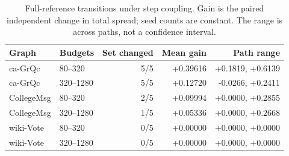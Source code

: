 \begin{table}[htbp]
\caption{Full-reference transitions under step coupling. Gain is the paired independent change in total spread; seed counts are constant. The range is across paths, not a confidence interval.}\label{tab:transitions}
\begin{tabular}{llrrr}
\toprule
Graph & Budgets & Set changed & Mean gain & Path range \\
\midrule
ca-GrQc & 80--320 & 5/5 & +0.39616 & +0.1819, +0.6139 \\
ca-GrQc & 320--1280 & 5/5 & +0.12720 & -0.0266, +0.2411 \\
CollegeMsg & 80--320 & 2/5 & +0.09994 & +0.0000, +0.2855 \\
CollegeMsg & 320--1280 & 1/5 & +0.05336 & +0.0000, +0.2668 \\
wiki-Vote & 80--320 & 0/5 & +0.00000 & +0.0000, +0.0000 \\
wiki-Vote & 320--1280 & 0/5 & +0.00000 & +0.0000, +0.0000 \\
\bottomrule
\end{tabular}
\end{table}
